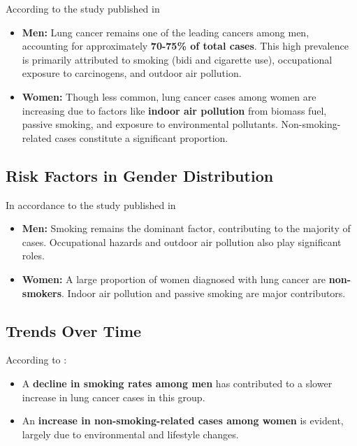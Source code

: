 According to the study published in \cite{meza2015lung}
\begin{outline}
\begin{itemize}
    \item \textbf{Men:} Lung cancer remains one of the leading cancers among men, accounting for approximately \textbf{70-75\% of total cases}. This high prevalence is primarily attributed to smoking (bidi and cigarette use), occupational exposure to carcinogens, and outdoor air pollution.
    \item \textbf{Women:} Though less common, lung cancer cases among women are increasing due to factors like \textbf{indoor air pollution} from biomass fuel, passive smoking, and exposure to environmental pollutants. Non-smoking-related cases constitute a significant proportion.
\end{itemize}
\end{outline}

\subsection{Risk Factors in Gender Distribution}
In accordance to the study published in \cite{huang2022distribution}
\begin{outline}
\begin{itemize}

    \item \textbf{Men:} Smoking remains the dominant factor, contributing to the majority of cases. Occupational hazards and outdoor air pollution also play significant roles.
    \item \textbf{Women:} A large proportion of women diagnosed with lung cancer are \textbf{non-smokers}. Indoor air pollution and passive smoking are major contributors.
\end{itemize}
\end{outline}

\subsection{Trends Over Time}
According to \cite{jemal2001recent}:
\begin{outline}
\begin{itemize}

    \item A \textbf{decline in smoking rates among men} has contributed to a slower increase in lung cancer cases in this group.
    \item An \textbf{increase in non-smoking-related cases among women} is evident, largely due to environmental and lifestyle changes.
\end{itemize}
\end{outline}

